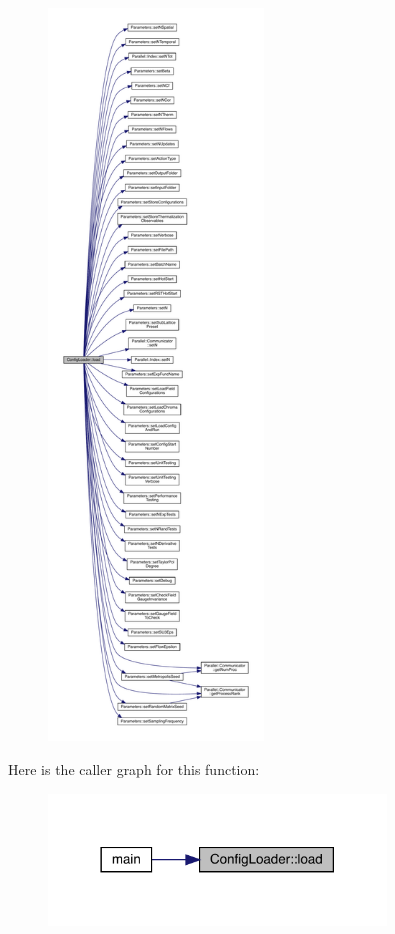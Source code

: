 \begin{figure}[H]
\begin{center}
\leavevmode
\includegraphics[height=550pt]{namespace_config_loader_a26cf01adba9411ef1fa006d5068d7cc4_cgraph}
\end{center}
\end{figure}
Here is the caller graph for this function\+:
\nopagebreak
\begin{figure}[H]
\begin{center}
\leavevmode
\includegraphics[width=254pt]{namespace_config_loader_a26cf01adba9411ef1fa006d5068d7cc4_icgraph}
\end{center}
\end{figure}
